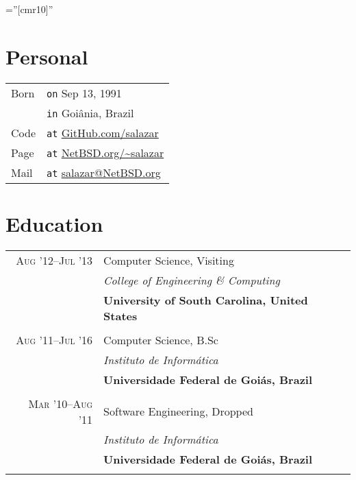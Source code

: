 \documentclass[a4paper,10pt]{article}
\begin{document}
\font\fb=''[cmr10]''

\par{\bigskip\par\vspace{8ex}}

\section{Personal}

\begin{tabular}{l@{\hskip 0.2cm}l}
  Born & \texttt{on} Sep 13, 1991 \\
       & \texttt{in} Goiânia, Brazil \\
  Code & \texttt{at} \href{https://www.github.com/salazar/}
                          {GitHub.com/salazar} \\
  Page & \texttt{at} \href{https://www.netbsd.org/~salazar}
                          {NetBSD.org/\textasciitilde salazar} \\
  Mail & \texttt{at} \href{mailto:salazar@NetBSD.org}
                          {salazar@NetBSD.org} 
 
\end{tabular}

\section{Education}
\begin{tabular}{r|p{11cm}}

  \textsc{Aug '12--Jul '13} & Computer Science, Visiting\\ &
  \emph{College of Engineering \& Computing}\\ &
  \textbf{University of South Carolina, United States}
  \\\multicolumn{2}{c}{} \\

  \textsc{Aug '11--Jul '16} & Computer Science, B.Sc\\ &
  \emph{Instituto de Informática}\\ &
  \textbf{Universidade Federal de Goiás, Brazil}
  \\\multicolumn{2}{c}{} \\

  \textsc{Mar '10--Aug '11} & Software Engineering, Dropped \\ &
  \emph{Instituto de Informática}\\ &
  \textbf{Universidade Federal de Goiás, Brazil}
  \\\multicolumn{2}{c}{} \\

\end{tabular}
\end{document}
